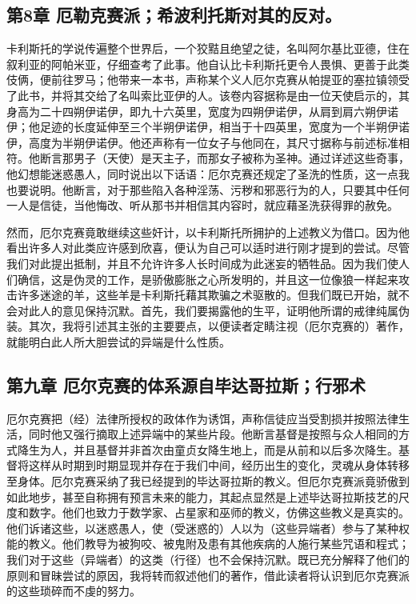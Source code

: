 
\subsection{第8章 厄勒克赛派；希波利托斯对其的反对。}

卡利斯托的学说传遍整个世界后，一个狡黠且绝望之徒，名叫阿尔基比亚德，住在叙利亚的阿帕米亚，仔细查考了此事。他自认比卡利斯托更令人畏惧、更善于此类伎俩，便前往罗马；他带来一本书，声称某个义人厄尔克赛从帕提亚的塞拉镇领受了此书，并将其交给了名叫索比亚伊的人。该卷内容据称是由一位天使启示的，其身高为二十四朔伊诺伊，即九十六英里，宽度为四朔伊诺伊，从肩到肩六朔伊诺伊；他足迹的长度延伸至三个半朔伊诺伊，相当于十四英里，宽度为一个半朔伊诺伊，高度为半朔伊诺伊。他还声称有一位女子与他同在，其尺寸据称与前述标准相符。他断言那男子（天使）是天主子，而那女子被称为圣神。通过详述这些奇事，他幻想能迷惑愚人，同时说出以下话语：厄尔克赛还规定了圣洗的性质，这一点我也要说明。他断言，对于那些陷入各种淫荡、污秽和邪恶行为的人，只要其中任何一人是信徒，当他悔改、听从那书并相信其内容时，就应藉圣洗获得罪的赦免。\par

然而，厄尔克赛竟敢继续这些奸计，以卡利斯托所拥护的上述教义为借口。因为他看出许多人对此类应许感到欣喜，便认为自己可以适时进行刚才提到的尝试。尽管我们对此提出抵制，并且不允许许多人长时间成为此迷妄的牺牲品。因为我们使人们确信，这是伪灵的工作，是骄傲膨胀之心所发明的，并且这一位像狼一样起来攻击许多迷途的羊，这些羊是卡利斯托藉其欺骗之术驱散的。但我们既已开始，就不会对此人的意见保持沉默。首先，我们要揭露他的生平，证明他所谓的戒律纯属伪装。其次，我将引述其主张的主要要点，以便读者定睛注视（厄尔克赛的）著作，就能明白此人所大胆尝试的异端是什么性质。\par


\subsection{第九章 厄尔克赛的体系源自毕达哥拉斯；行邪术}

厄尔克赛把（经）法律所授权的政体作为诱饵，声称信徒应当受割损并按照法律生活，同时他又强行摘取上述异端中的某些片段。他断言基督是按照与众人相同的方式降生为人，并且基督并非首次由童贞女降生地上，而是从前和以后多次降生。基督将这样从时期到时期显现并存在于我们中间，经历出生的变化，灵魂从身体转移至身体。厄尔克赛采纳了我已经提到的毕达哥拉斯的教义。但厄尔克赛派竟骄傲到如此地步，甚至自称拥有预言未来的能力，其起点显然是上述毕达哥拉斯技艺的尺度和数字。他们也致力于数学家、占星家和巫师的教义，仿佛这些教义是真实的。他们诉诸这些，以迷惑愚人，使（受迷惑的）人以为（这些异端者）参与了某种权能的教义。他们教导为被狗咬、被鬼附及患有其他疾病的人施行某些咒语和程式；我们对于这些（异端者）的这类（行径）也不会保持沉默。既已充分解释了他们的原则和冒昧尝试的原因，我将转而叙述他们的著作，借此读者将认识到厄尔克赛派的这些琐碎而不虔的努力。\par

